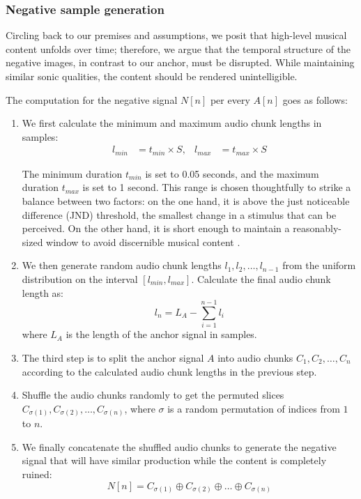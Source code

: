 \subsubsection{Negative sample generation}

Circling back to our premises and assumptions, we posit that high-level musical content unfolds over time; therefore, we argue that the temporal structure of the negative images, in contrast to our anchor, must be disrupted. While maintaining similar sonic qualities, the content should be rendered unintelligible.

The computation for the negative signal $N[n]$ per every $A[n]$ goes as follows:

\begin{enumerate}
\item We first calculate the minimum and maximum audio chunk lengths in samples:
\begin{align}
l_{min} &= t_{min} \times S, &
l_{max} &= t_{max} \times S
\end{align}

The minimum duration $t_{min}$ is set to 0.05 seconds, and the maximum duration $t_{max}$ is set to 1 second. This range is chosen thoughtfully to strike a balance between two factors: on the one hand, it is above the just noticeable difference (JND) threshold, the smallest change in a stimulus that can be perceived. On the other hand, it is short enough to maintain a reasonably-sized window to avoid discernible musical content \cite{Fastl2007Just-NoticeableChanges}.

\item We then generate random audio chunk lengths $l_1, l_2, \ldots, l_{n-1}$ from the uniform distribution on the interval $[l_{min}, l_{max}]$. Calculate the final audio chunk length as:
\begin{equation}
l_n = L_A - \sum_{i=1}^{n-1} l_i
\end{equation}
where $L_A$ is the length of the anchor signal in samples.

\item The third step is to split the anchor signal $A$ into audio chunks $C_1, C_2, \ldots, C_n$ according to the calculated audio chunk lengths in the previous step.

\item Shuffle the audio chunks randomly to get the permuted slices $C_{\sigma(1)}, C_{\sigma(2)}, \ldots, C_{\sigma(n)}$, where $\sigma$ is a random permutation of indices from $1$ to $n$. 

\item We finally concatenate the shuffled audio chunks to generate the negative signal that will have similar production while the content is completely ruined:
\begin{equation}\label{eq:negative_signal}
N[n] = C_{\sigma(1)} \oplus C_{\sigma(2)} \oplus \ldots \oplus C_{\sigma(n)}
\end{equation}
\end{enumerate}

